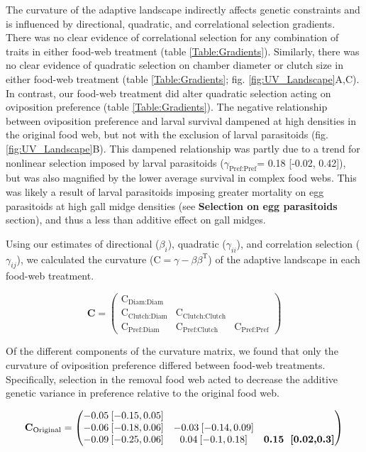\documentclass[11pt,]{article}
\begin{document}
\indent The curvature of the adaptive landscape indirectly affects
genetic constraints and is influenced by directional, quadratic, and
correlational selection gradients. There was no clear evidence of
correlational selection for any combination of traits in either food-web
treatment (table \ref{Table:Gradients}). Similarly, there was no clear
evidence of quadratic selection on chamber diameter or clutch size in
either food-web treatment (table \ref{Table:Gradients}; fig.
\ref{fig:UV_Landscape}A,C). In contrast, our food-web treatment did
alter quadratic selection acting on oviposition preference (table
\ref{Table:Gradients}). The negative relationship between oviposition
preference and larval survival dampened at high densities in the
original food web, but not with the exclusion of larval parasitoids
(fig. \ref{fig:UV_Landscape}B). This dampened relationship was partly
due to a trend for nonlinear selection imposed by larval parasitoids
(\(\gamma_{\text{Pref:Pref}}\)= 0.18 {[}-0.02, 0.42{]}), but was also
magnified by the lower average survival in complex food webs. This was
likely a result of larval parasitoids imposing greater mortality on egg
parasitoids at high gall midge densities (see \textbf{Selection on egg
parasitoids} section), and thus a less than additive effect on gall
midges.

Using our estimates of directional (\(\beta_i\)), quadratic
(\(\gamma_{ii}\)), and correlation selection (\(\gamma_{ij}\)), we
calculated the curvature (\(\text{C}=\gamma - \beta \beta^\text{T}\)) of
the adaptive landscape in each food-web treatment.

\[\textbf{C} = \begin{pmatrix} \text{C}_{\text{Diam:Diam}}&& \\ \text{C}_{\text{Clutch:Diam}} & \text{C}_{\text{Clutch:Clutch}} & \\ \text{C}_{\text{Pref:Diam}} & \text{C}_{\text{Pref:Clutch}} & \text{C}_{\text{Pref:Pref}} \end{pmatrix}\]

Of the different components of the curvature matrix, we found that only
the curvature of oviposition preference differed between food-web
treatments. Specifically, selection in the removal food web acted to
decrease the additive genetic variance in preference relative to the
original food web.

\[\textbf{C}_{\text{Original}} = \begin{pmatrix} 
-0.05\: [-0.15,0.05] &  &  \\  
-0.06\: [-0.18,0.06] & -0.03\: [-0.14,0.09] &  \\  
-0.09\: [-0.25,0.06] & 0.04\: [-0.1,0.18] & \textbf{0.15\: [0.02,0.3]} \end{pmatrix}\]
\end{document}

